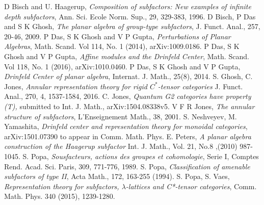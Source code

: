
\begin{thebibliography}{ABCD5}
 D Bisch and U. Haagerup, \textit{Composition of subfactors: New examples of infinite depth subfactors}, Ann. Sci. Ecole Norm. Sup., 29, 329-383, 1996.
 D Bisch, P Das and S K Ghosh, \textit{The planar algebra of group-type subfactors}, J. Funct. Anal., 257, 20-46, 2009.
 P Das, S K Ghosh and V P Gupta, \textit{Perturbations of Planar Algebras}, Math. Scand. Vol 114, No. 1 (2014), arXiv:1009.0186. 
 P Das, S K Ghosh and V P Gupta, \textit{Affine modules and the Drinfeld Center}, Math. Scand. Vol 118, No. 1 (2016), arXiv:1010.0460. 
 P Das, S K Ghosh and V P Gupta, \textit{ Drinfeld Center of planar algebra}, Internat. J. Math., 25(8), 2014.
 S. Ghosh, C. Jones, \textit{Annular representation theory for rigid $ C^* $-tensor categories} J. Funct. Anal., 270, 4, 1537-1584, 2016.
 C. Jones, \textit{Quantum G2 categories have property (T),} submitted to Int. J. Math., arXiv:1504.08338v5.
 V F R Jones, \textit{The annular structure of subfactors}, L'Enseignement Math., 38, 2001.
 S. Neshveyev, M. Yamashita, \textit{Drinfeld center and representation theory for monoidal categories}, arXiv:1501.07390 
to appear in Comm. Math. Phys.
 E. Peters, \textit{A planar algebra construction of the Haagerup subfactor} Int. J. Math., Vol. 21, No.8 ,(2010) 987-1045.
 S. Popa, \textit{Sousfacteurs, actions des groupes et cohomologie}, Serie I, Comptes Rend. Acad. Sci. Paris, 309, 771-776, 1989.
 S. Popa, \textit{Classification of amenable subfactors of type II}, Acta Math., 172, 163-255 (1994).
 S. Popa, S. Vaes, \textit{Representation theory for subfactors, $\lambda$-lattices and C*-tensor categories}, 
Comm. Math. Phys. 340 (2015), 1239-1280.








\end{thebibliography}
